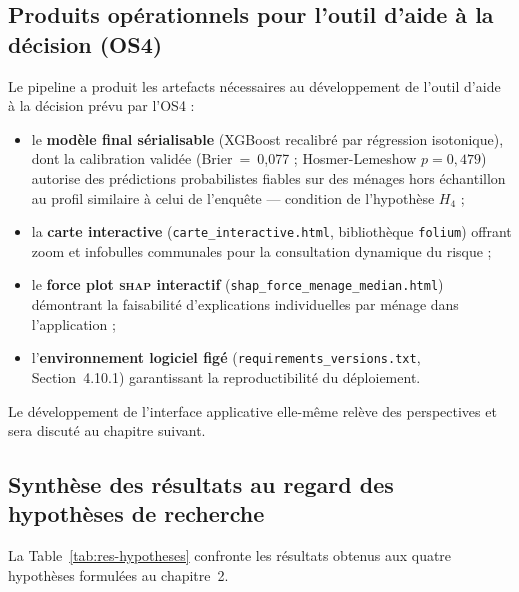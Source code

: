 \subsection{Produits opérationnels pour l'outil d'aide à la décision (OS4)}
\label{ssec:res-os4}

Le pipeline a produit les artefacts nécessaires au développement de l'outil
d'aide à la décision prévu par l'OS4 :

\begin{itemize}
  \item le \textbf{modèle final sérialisable} (XGBoost recalibré par régression
        isotonique), dont la calibration validée (Brier~=~0,077 ;
        Hosmer-Lemeshow $p = 0{,}479$) autorise des prédictions probabilistes
        fiables sur des ménages hors échantillon au profil similaire à celui de
        l'enquête — condition de l'hypothèse $H_4$ ;
  \item la \textbf{carte interactive} (\texttt{carte\_interactive.html},
        bibliothèque \texttt{folium}) offrant zoom et infobulles communales
        pour la consultation dynamique du risque ;
  \item le \textbf{force plot \textsc{shap} interactif}
        (\texttt{shap\_force\_menage\_median.html}) démontrant la faisabilité
        d'explications individuelles par ménage dans l'application ;
  \item l'\textbf{environnement logiciel figé}
        (\texttt{requirements\_versions.txt}, Section~4.10.1) garantissant la
        reproductibilité du déploiement.
\end{itemize}

Le développement de l'interface applicative elle-même relève des perspectives
et sera discuté au chapitre suivant.

\subsection{Synthèse des résultats au regard des hypothèses de recherche}
\label{ssec:res-hypotheses}

La Table~\ref{tab:res-hypotheses} confronte les résultats obtenus aux quatre
hypothèses formulées au chapitre~2.


